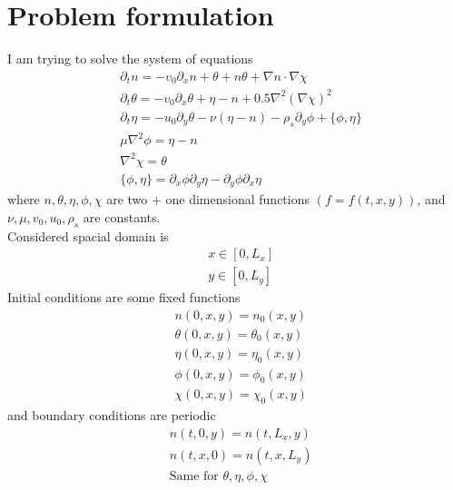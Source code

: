 \documentclass[preprint,aip,pop]{article}
\begin{document}
\section{Problem formulation}
I am trying to solve the system of equations
\begin{subequations}
\begin{align}
& \partial_t n           = -v_0 \partial_x n  + \theta + n \theta + \nabla n \cdot \nabla \chi \\
& \partial_t \theta    = -v_0 \partial_x \theta + \eta - n + 0.5\nabla^2 (\nabla \chi)^2 \\
& \partial_t \eta       = -u_0 \partial_y \theta - \nu (\eta - n) - \rho_s \partial_y \phi + \{ \phi, \eta\} \\
& \mu \nabla^2 \phi = \eta - n \\
&  \nabla^2 \chi = \theta  \\
& \{ \phi , \eta\}  = \partial_x \phi  \partial_y\eta - \partial_y\phi  \partial_x\eta
\end{align}
  \label{mainSystem}
  \end{subequations}
where $n, \theta, \eta, \phi, \chi$ are two $+$ one dimensional functions $(f =
f(t,x,y))$, and $\nu, \mu, v_0, u_0, \rho_s$ are constants. \\
Considered spacial domain is
\begin{align}
  & x  \in [0,L_x]  \\
  & y  \in [0,L_y]
\end{align}
Initial conditions are some fixed functions
\begin{align}
 &  n(0,x,y) = n_0 (x,y) \\
 &  \theta(0,x,y) = \theta_0 (x,y) \\
 &  \eta(0,x,y) = \eta_0 (x,y) \\
 &  \phi(0,x,y) = \phi_0 (x,y) \\
 &  \chi(0,x,y) = \chi_0 (x,y) 
\end{align}
and boundary conditions are periodic
\begin{align}
  & n(t,0,y) = n(t,L_x,y) \\
  & n(t,x,0) = n(t,x,L_y) \\
  & \mbox{Same for } \theta, \eta, \phi, \chi
\end{align}
\end{document}
